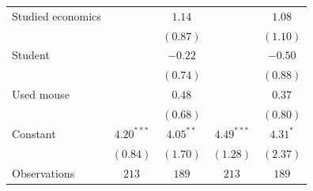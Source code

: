 \begin{tabular}{l c c c c}
Studied economics        &               & $1.14$        &               & $1.08$        \\
                         &               & $(0.87)$      &               & $(1.10)$      \\
Student                  &               & $-0.22$       &               & $-0.50$       \\
                         &               & $(0.74)$      &               & $(0.88)$      \\
Used mouse               &               & $0.48$        &               & $0.37$        \\
                         &               & $(0.68)$      &               & $(0.80)$      \\
Constant                 & $4.20^{***}$  & $4.05^{**}$   & $4.49^{***}$  & $4.31^{*}$    \\
                         & $(0.84)$      & $(1.70)$      & $(1.28)$      & $(2.37)$      \\
\midrule
Observations                & $213$         & $189$         & $213$         & $189$         \\
\bottomrule
\end{tabular}
